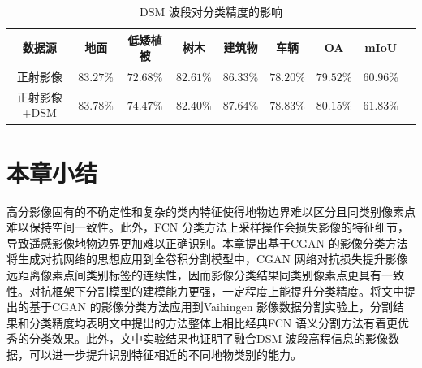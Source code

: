 \begin{table}[htbp]
  \caption{DSM 波段对分类精度的影响}\label{tab:dsm_affect}
  \centering
  \begin{tabular}{ccccccccc}
    \toprule
   数据源             & 地面 & 低矮植被 & 树木 & 建筑物 & 车辆 & OA & mIoU \\
    \midrule
    正射影像     & $83.27\%$ & $72.68\%$ & $82.61\%$ & $86.33\%$ & $78.20\%$   & $79.52\%$ & $60.96\%$ \\
    正射影像+DSM & $83.78\%$ & $74.47\%$ & $82.40\%$ & $87.64\%$ & $78.83\%$ & $80.15\%$ & \textbf{$61.83\%$} \\
    \bottomrule
  \end{tabular}
\end{table}

\section{本章小结}
\label{sec:forth}
高分影像固有的不确定性和复杂的类内特征使得地物边界难以区分且同类别像素点难以保持空间一致性。此外，FCN 分类方法上采样操作会损失影像的特征细节，导致遥感影像地物边界更加难以正确识别。本章提出基于CGAN 的影像分类方法将生成对抗网络的思想应用到全卷积分割模型中，CGAN 网络对抗损失提升影像远距离像素点间类别标签的连续性，因而影像分类结果同类别像素点更具有一致性。对抗框架下分割模型的建模能力更强，一定程度上能提升分类精度。将文中提出的基于CGAN 的影像分类方法应用到Vaihingen 影像数据分割实验上，分割结果和分类精度均表明文中提出的方法整体上相比经典FCN 语义分割方法有着更优秀的分类效果。此外，文中实验结果也证明了融合DSM 波段高程信息的影像数据，可以进一步提升识别特征相近的不同地物类别的能力。
